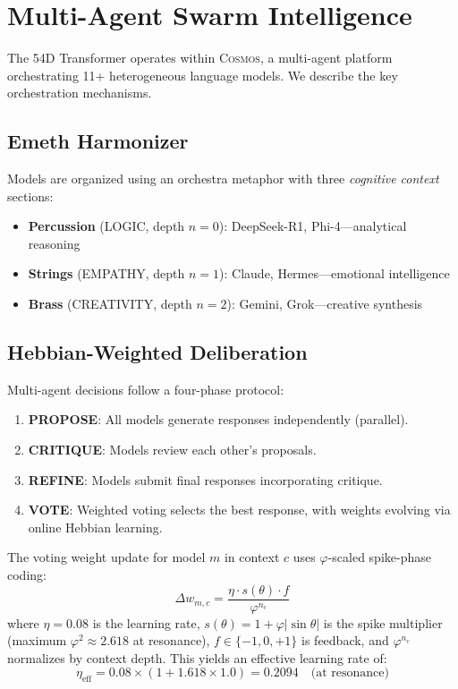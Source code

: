 \documentclass[11pt,a4paper]{article}
\begin{document}
\section{Multi-Agent Swarm Intelligence}
\label{sec:swarm}

The 54D Transformer operates within \textsc{Cosmos}, a multi-agent platform orchestrating 11+ heterogeneous language models. We describe the key orchestration mechanisms.

\subsection{Emeth Harmonizer}

Models are organized using an orchestra metaphor with three \emph{cognitive context} sections:
\begin{itemize}[itemsep=2pt]
    \item \textbf{Percussion} (LOGIC, depth $n=0$): DeepSeek-R1, Phi-4---analytical reasoning
    \item \textbf{Strings} (EMPATHY, depth $n=1$): Claude, Hermes---emotional intelligence
    \item \textbf{Brass} (CREATIVITY, depth $n=2$): Gemini, Grok---creative synthesis
\end{itemize}

\subsection{Hebbian-Weighted Deliberation}
\label{sec:deliberation}

Multi-agent decisions follow a four-phase protocol:
\begin{enumerate}[itemsep=2pt]
    \item \textbf{PROPOSE}: All models generate responses independently (parallel).
    \item \textbf{CRITIQUE}: Models review each other's proposals.
    \item \textbf{REFINE}: Models submit final responses incorporating critique.
    \item \textbf{VOTE}: Weighted voting selects the best response, with weights evolving via online Hebbian learning.
\end{enumerate}

The voting weight update for model $m$ in context $c$ uses $\varphi$-scaled spike-phase coding:
\begin{equation}
    \Delta w_{m,c} = \frac{\eta \cdot s(\theta) \cdot f}{\varphi^{n_c}}
    \label{eq:swarm-hebb}
\end{equation}
where $\eta = 0.08$ is the learning rate, $s(\theta) = 1 + \varphi|\sin\theta|$ is the spike multiplier (maximum $\varphi^2 \approx 2.618$ at resonance), $f \in \{-1, 0, +1\}$ is feedback, and $\varphi^{n_c}$ normalizes by context depth. This yields an effective learning rate of:
\begin{equation}
    \eta_{\text{eff}} = 0.08 \times (1 + 1.618 \times 1.0) = 0.2094 \quad \text{(at resonance)}
\end{equation}
\end{document}
